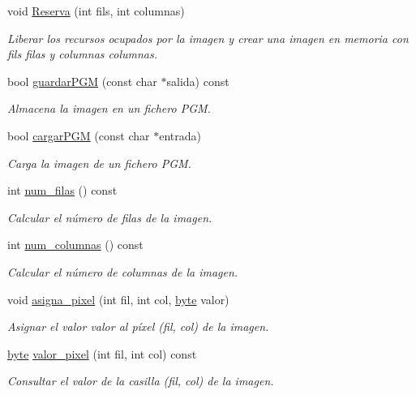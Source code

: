 \begin{CompactItemize}
void \hyperlink{classImagen_726f1bfb93e599bd4ae7d71f7cd1705a}{Reserva} (int fils, int columnas)
\begin{CompactList}\small\item\em Liberar los recursos ocupados por la imagen y crear una imagen en memoria con fils filas y columnas columnas. \item\end{CompactList}\item 
bool \hyperlink{classImagen_a3a61f0842e0dc3d0309c42d229478b7}{guardarPGM} (const char $\ast$salida) const 
\begin{CompactList}\small\item\em Almacena la imagen en un fichero PGM. \item\end{CompactList}\item 
bool \hyperlink{classImagen_1fcb000bb29513d2fb4b77e3785827f8}{cargarPGM} (const char $\ast$entrada)
\begin{CompactList}\small\item\em Carga la imagen de un fichero PGM. \item\end{CompactList}\item 
int \hyperlink{classImagen_56e4e6b003149ea2bc9dfecf09b22d5a}{num\_\-filas} () const 
\begin{CompactList}\small\item\em Calcular el número de filas de la imagen. \item\end{CompactList}\item 
int \hyperlink{classImagen_29f1a1d6a8b9afb41036d76e9d64d4eb}{num\_\-columnas} () const 
\begin{CompactList}\small\item\em Calcular el número de columnas de la imagen. \item\end{CompactList}\item 
void \hyperlink{classImagen_566a2ba8ed9fbc3d79b77e162e9cc740}{asigna\_\-pixel} (int fil, int col, \hyperlink{Imagen_8h_0c8186d9b9b7880309c27230bbb5e69d}{byte} valor)
\begin{CompactList}\small\item\em Asignar el valor valor al píxel (fil, col) de la imagen. \item\end{CompactList}\item 
\hyperlink{Imagen_8h_0c8186d9b9b7880309c27230bbb5e69d}{byte} \hyperlink{classImagen_415bc0106229748b010bfc4f90b4f52c}{valor\_\-pixel} (int fil, int col) const 
\begin{CompactList}\small\item\em Consultar el valor de la casilla (fil, col) de la imagen. \item\end{CompactList}\end{CompactItemize}


